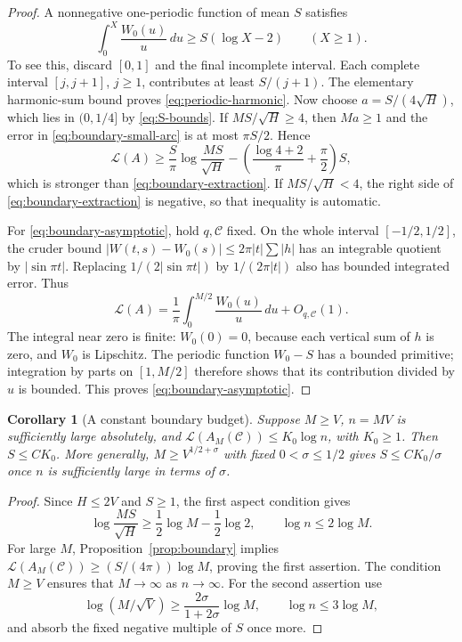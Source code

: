 \documentclass[11pt,reqno]{amsart}
\numberwithin{equation}{section}
\newtheorem{corollary}[theorem]{Corollary}
\theoremstyle{definition}
\theoremstyle{remark}
\newcommand{\La}{\mathcal L}
\begin{document}
\begin{proof}
A nonnegative one-periodic function of mean $S$ satisfies
\begin{equation}\label{eq:periodic-harmonic}
 \int_0^X\frac{W_0(u)}u\,du\ge S(\log X-2)\qquad(X\ge1).
\end{equation}
To see this, discard $[0,1]$ and the final incomplete interval. Each
complete interval $[j,j+1]$, $j\ge1$, contributes at least $S/(j+1)$.
The elementary harmonic-sum bound proves \eqref{eq:periodic-harmonic}.
Now choose $a=S/(4\sqrt H)$, which lies in $(0,1/4]$ by
\eqref{eq:S-bounds}. If $MS/\sqrt H\ge4$, then $Ma\ge1$ and the error
in \eqref{eq:boundary-small-arc} is at most $\pi S/2$. Hence
\[
 \La(A)\ge\frac S\pi\log\frac{MS}{\sqrt H}
       -\left(\frac{\log4+2}{\pi}+\frac\pi2\right)S,
\]
which is stronger than \eqref{eq:boundary-extraction}. If
$MS/\sqrt H<4$, the right side of \eqref{eq:boundary-extraction} is
negative, so that inequality is automatic.

For \eqref{eq:boundary-asymptotic}, hold $q,\mathcal C$ fixed. On the
whole interval $[-1/2,1/2]$, the cruder bound
$|W(t,s)-W_0(s)|\le2\pi|t|\sum|h|$ has an integrable quotient by
$|\sin\pi t|$. Replacing $1/(2|\sin\pi t|)$ by $1/(2\pi|t|)$ also
has bounded integrated error. Thus
\[
 \La(A)=\frac1\pi\int_0^{M/2}\frac{W_0(u)}u\,du+O_{q,\mathcal C}(1).
\]
The integral near zero is finite: $W_0(0)=0$, because each vertical
sum of $h$ is zero, and $W_0$ is Lipschitz. The periodic function
$W_0-S$ has a bounded primitive; integration by parts on $[1,M/2]$
therefore shows that its contribution divided by $u$ is bounded.
This proves \eqref{eq:boundary-asymptotic}.
\end{proof}

\begin{corollary}[A constant boundary budget]\label{cor:boundary-budget}
Suppose $M\ge V$, $n=MV$ is sufficiently large absolutely, and
$\La(A_M(\mathcal C))\le K_0\log n$, with $K_0\ge1$. Then
$S\le CK_0$. More generally, $M\ge V^{1/2+\sigma}$ with fixed
$0<\sigma\le1/2$ gives $S\le CK_0/\sigma$ once $n$ is sufficiently
large in terms of $\sigma$.
\end{corollary}
\begin{proof}
Since $H\le2V$ and $S\ge1$, the first aspect condition gives
\[
 \log\frac{MS}{\sqrt H}\ge\frac12\log M-\frac12\log2,
 \qquad\log n\le2\log M.
\]
For large $M$, Proposition~\ref{prop:boundary} implies
$\La(A_M(\mathcal C))\ge(S/(4\pi))\log M$, proving the first assertion.
The condition $M\ge V$ ensures that $M\to\infty$ as $n\to\infty$.
For the second assertion use
\[
 \log(M/\sqrt V)\ge\frac{2\sigma}{1+2\sigma}\log M,
 \qquad\log n\le3\log M,
\]
and absorb the fixed negative multiple of $S$ once more.
\end{proof}
\end{document}
